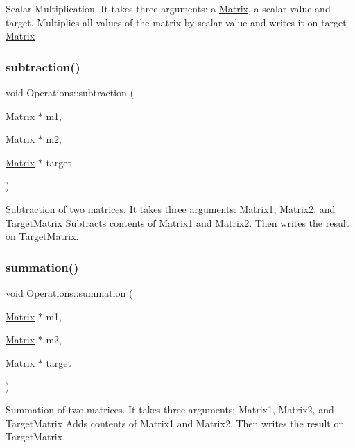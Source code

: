 Scalar Multiplication. It takes three arguments\+: a \hyperlink{class_matrix}{Matrix}, a scalar value and target. Multiplies all values of the matrix by scalar value and writes it on target \hyperlink{class_matrix}{Matrix} \mbox{\label{class_operations_a45086ee9e548ad7a199cc4214b841dff}} 
\subsubsection{\texorpdfstring{subtraction()}{subtraction()}}
{\footnotesize\ttfamily void Operations\+::subtraction (\begin{DoxyParamCaption}\item[{\hyperlink{class_matrix}{Matrix} $\ast$}]{m1,  }\item[{\hyperlink{class_matrix}{Matrix} $\ast$}]{m2,  }\item[{\hyperlink{class_matrix}{Matrix} $\ast$}]{target }\end{DoxyParamCaption})}

Subtraction of two matrices. It takes three arguments\+: Matrix1, Matrix2, and Target\+Matrix Subtracts contents of Matrix1 and Matrix2. Then writes the result on Target\+Matrix. \mbox{\label{class_operations_a23b256cbd8432c02e7501c7c04d654d7}} 
\subsubsection{\texorpdfstring{summation()}{summation()}}
{\footnotesize\ttfamily void Operations\+::summation (\begin{DoxyParamCaption}\item[{\hyperlink{class_matrix}{Matrix} $\ast$}]{m1,  }\item[{\hyperlink{class_matrix}{Matrix} $\ast$}]{m2,  }\item[{\hyperlink{class_matrix}{Matrix} $\ast$}]{target }\end{DoxyParamCaption})}

Summation of two matrices. It takes three arguments\+: Matrix1, Matrix2, and Target\+Matrix Adds contents of Matrix1 and Matrix2. Then writes the result on Target\+Matrix. \mbox{\label{class_operations_a58bdbb6d16f1848424bbe4bba8e50630}} 
